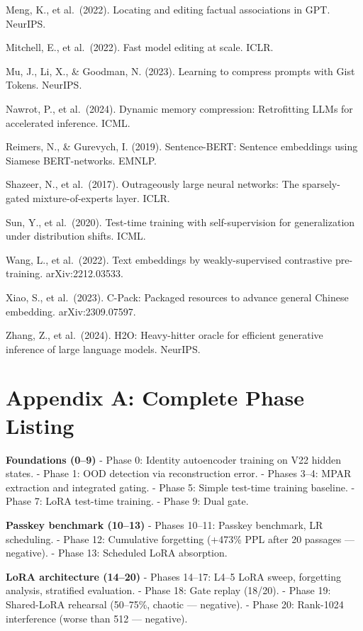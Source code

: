 Meng, K., et al.~(2022). Locating and editing factual associations in GPT. NeurIPS.

Mitchell, E., et al.~(2022). Fast model editing at scale. ICLR.

Mu, J., Li, X., \& Goodman, N. (2023). Learning to compress prompts with Gist Tokens. NeurIPS.

Nawrot, P., et al.~(2024). Dynamic memory compression: Retrofitting LLMs for accelerated inference. ICML.

Reimers, N., \& Gurevych, I. (2019). Sentence-BERT: Sentence embeddings using Siamese BERT-networks. EMNLP.

Shazeer, N., et al.~(2017). Outrageously large neural networks: The sparsely-gated mixture-of-experts layer. ICLR.

Sun, Y., et al.~(2020). Test-time training with self-supervision for generalization under distribution shifts. ICML.

Wang, L., et al.~(2022). Text embeddings by weakly-supervised contrastive pre-training. arXiv:2212.03533.

Xiao, S., et al.~(2023). C-Pack: Packaged resources to advance general Chinese embedding. arXiv:2309.07597.

Zhang, Z., et al.~(2024). H2O: Heavy-hitter oracle for efficient generative inference of large language models. NeurIPS.

\section{Appendix A: Complete Phase Listing}\label{appendix-a-complete-phase-listing}

\textbf{Foundations (0--9)} - Phase 0: Identity autoencoder training on V22 hidden states. - Phase 1: OOD detection via reconstruction error. - Phases 3--4: MPAR extraction and integrated gating. - Phase 5: Simple test-time training baseline. - Phase 7: LoRA test-time training. - Phase 9: Dual gate.

\textbf{Passkey benchmark (10--13)} - Phases 10--11: Passkey benchmark, LR scheduling. - Phase 12: Cumulative forgetting (+473\% PPL after 20 passages --- negative). - Phase 13: Scheduled LoRA absorption.

\textbf{LoRA architecture (14--20)} - Phases 14--17: L4--5 LoRA sweep, forgetting analysis, stratified evaluation. - Phase 18: Gate replay (18/20). - Phase 19: Shared-LoRA rehearsal (50--75\%, chaotic --- negative). - Phase 20: Rank-1024 interference (worse than 512 --- negative).

